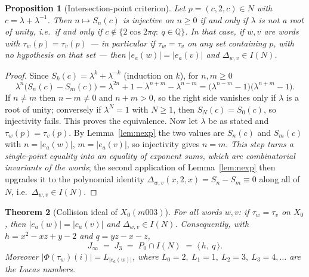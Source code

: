 \documentclass[11pt,a4paper]{article}
\newtheorem{theorem}{Theorem}[section]
\newtheorem{proposition}[theorem]{Proposition}
\theoremstyle{definition}
\theoremstyle{remark}
\newcommand{\Q}{\mathbb{Q}}
\begin{document}
\begin{proposition}[Intersection-point criterion]
\label{prop:ipc}
Let $p=(c,2,c)\in N$ with $c=\lambda+\lambda^{-1}$. Then
$n\mapsto S_n(c)$ is injective on $n\ge0$ if and only if $\lambda$ is not
a root of unity, i.e.\ if and only if $c\notin\{2\cos 2\pi q:\ q\in\Q\}$.
In that case, if $w,v$ are words with $\tau_w(p)=\tau_v(p)$ --- in
particular if $\tau_w=\tau_v$ on any set containing $p$, with no
hypothesis on that set --- then $|e_a(w)|=|e_a(v)|$ and
$\Delta_{w,v}\in I(N)$.
\end{proposition}

\begin{proof}
Since $S_k(c)=\lambda^k+\lambda^{-k}$ (induction on $k$), for $n,m\ge0$
\begin{equation}
\lambda^{n}\bigl(S_n(c)-S_m(c)\bigr)
=\lambda^{2n}+1-\lambda^{n+m}-\lambda^{n-m}
=\bigl(\lambda^{n-m}-1\bigr)\bigl(\lambda^{n+m}-1\bigr).
\end{equation}
If $n\neq m$ then $n-m\neq0$ and $n+m>0$, so the right side vanishes
only if $\lambda$ is a root of unity; conversely if
$\lambda^N=1$ with $N\ge1$, then $S_{N}(c)=S_0(c)$, so injectivity
fails. This proves the equivalence. Now let $\lambda$ be as stated and
$\tau_w(p)=\tau_v(p)$. By Lemma~\ref{lem:nexp} the two values are
$S_n(c)$ and $S_m(c)$ with $n=|e_a(w)|$, $m=|e_a(v)|$, so injectivity
gives $n=m$. \emph{This step turns a single-point equality into an
equality of exponent sums, which are combinatorial invariants of the
words}; the second application of Lemma~\ref{lem:nexp} then upgrades
it to the polynomial identity $\Delta_{w,v}(x,2,x)=S_n-S_m\equiv0$ along
all of $N$, i.e.\ $\Delta_{w,v}\in I(N)$.
\end{proof}

\begin{theorem}[Collision ideal of $X_0(m003)$]
\label{thm:collision}
For all words $w,v$: if $\tau_w=\tau_v$ on $X_0$, then
$|e_a(w)|=|e_a(v)|$ and $\Delta_{w,v}\in I(N)$. Consequently, with
$h=x^2-xz+y-2$ and $q=yz-x-z$,
\begin{equation}
J_\infty \;=\; J_3 \;=\; P_0\cap I(N) \;=\; \langle\, h,\ q\,\rangle .
\end{equation}
Moreover $|\Phi(\tau_w)(i)|=L_{|e_a(w)|}$, where $L_0=2,\ L_1=1,\ L_2=3,\
L_3=4,\dots$ are the Lucas numbers.
\end{theorem}
\end{document}
